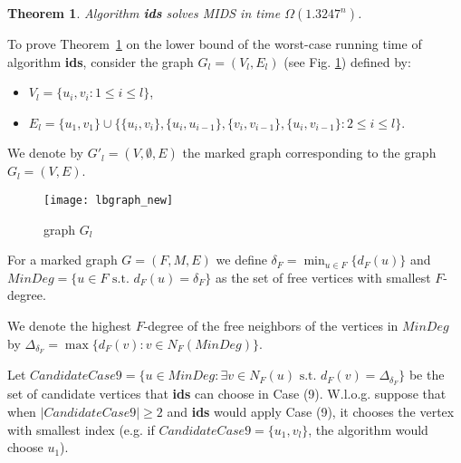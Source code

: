\documentclass[a4paper,10pt]{article}
\theoremstyle{plain}
\newtheorem{theorem}{Theorem}
\theoremstyle{definition}
\theoremstyle{remark}
\newcommand{\MIDSpb}{\textsc{MIDS}\xspace}
\begin{document}
\begin{theorem}
\label{lowerbound}
Algorithm {\bf ids} solves \MIDSpb in time $\Omega(1.3247^n)$.
\end{theorem}


To prove Theorem~\ref{lowerbound} on the lower bound of the worst-case running time of
algorithm {\bf ids},
consider the graph $G_l=(V_l,E_l)$ (see Fig. \ref{lbgraph}) defined by:
\begin{itemize}
\item $V_l = \{ u_i, v_i : 1 \leq i \leq l\}$,
\item $E_l =\{u_1,v_1\} \cup \big\{ \{ u_i,v_i\},\{u_i,u_{i-1}\}, \{v_i,v_{i-1}\}, \{u_i,v_{i-1}\} : 2 \leq i \leq l \big\}$.
\end{itemize}

We denote by $G'_l=(V,\emptyset,E)$ the marked graph corresponding
to the graph $G_l=(V,E)$.

\begin{figure}
\centering
      \texttt{[image: lbgraph\_new]}
      \caption{\label{lbgraph}graph $G_l$}
\end{figure}


For a marked graph $G=(F,M,E)$ we define
$\delta_F = \min_{u \in F} \{d_F(u)\}$
and
$MinDeg = \{u \in F \text{ s.t. } d_F(u) = \delta_F \}$ as the set of free vertices
with smallest $F$-degree.

We denote the highest $F$-degree of the free neighbors of the vertices in $MinDeg$ by
$\Delta_{\delta_F} = \max \big\{ d_F(v) : v \in N_F(MinDeg) \big\}$.

Let $CandidateCase9= \{ u \in MinDeg: \exists v \in N_F(u) \text{ s.t. } d_F(v) = \Delta_{\delta_F} \}$
be the set of candidate
vertices that {\bf ids} can choose in Case (9).
W.l.o.g. suppose that when $|CandidateCase9|\geq 2$ and {\bf ids} would
apply Case (9), it chooses the vertex
with smallest index (e.g. if $CandidateCase9 = \{u_1,v_l\}$, the algorithm would
choose $u_1$).
\end{document}
